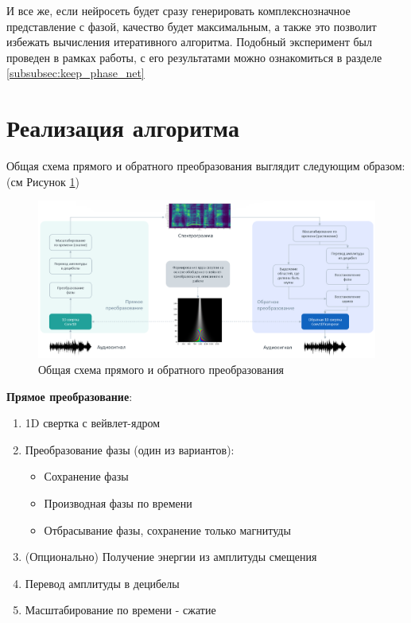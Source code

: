И все же, если нейросеть будет сразу генерировать комплекснозначное представление с фазой, 
качество будет максимальным, а также это позволит избежать вычисления итеративного алгоритма.
Подобный эксперимент был проведен в рамках работы, с его результатами можно ознакомиться в разделе \ref{subsubsec:keep_phase_net}


\section{Реализация алгоритма}

Общая схема прямого и обратного преобразования выглядит следующим образом: (см Рисунок \ref{fig:algorithm_overview})

\clearpage

\begin{figure}
  \centering
  \includegraphics[width=0.9\linewidth]{figures/algorithm_overview}
  \caption{Общая схема прямого и обратного преобразования}
  \label{fig:algorithm_overview}
\end{figure}

\textbf{Прямое преобразование}:
\begin{enumerate}[1.]
  \item 1D свертка с вейвлет-ядром
  \item Преобразование фазы (один из вариантов):
    \begin{itemize}
      \item Сохранение фазы
      \item Производная фазы по времени
      \item Отбрасывание фазы, сохранение только магнитуды
    \end{itemize}
  \item (Опционально) Получение энергии из амплитуды смещения
  \item Перевод амплитуды в децибелы
  \item Масштабирование по времени - сжатие
\end{enumerate}

